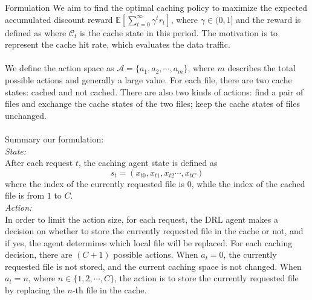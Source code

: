 \documentclass{article}
\begin{document}
\begin{section}{Formulation}
    We aim to find the optimal caching policy to maximize the expected accumulated discount reward $\mathbb{E}\left[\sum_{t=0}^{\infty}\gamma^tr_t\right]$, where $\gamma\in(0,1]$ and the reward is defined as
    where $\mathcal{C}_t$ is the cache state in this period. The motivation is to represent the cache hit rate, which evaluates the data traffic.\\~\\
    
    We define the action space as $\mathcal{A}=\{a_1,a_2,\cdots,a_m\}$, where $m$ describes the total possible actions and generally a large value. For each file, there are two cache states: cached and not cached. There are also two kinds of actions: find a pair of files and exchange the cache states of the two files; keep the cache states of files unchanged.\\~\\
 
    Summary our formulation:\\
    \emph{State:}\\
    After each request $t$, the caching agent state is defined as
    $$
        s_t=\left(x_{t0},x_{t1},x_{t2}\cdots,x_{tC}\right)
    $$
    where the index of the currently requested file is $0$, while the index of the cached file is from $1$ to $C$.\\
    \emph{Action:}\\
    In order to limit the action size, for each request, the DRL agent makes a decision on whether to store the currently requested file in the cache or not, and if yes, the agent determines which local file will be replaced. For each caching decision, there are $(C+1)$ possible actions. When $a_t=0$, the currently requested file is not stored, and the current caching space is not changed. When $a_t=n$, where $n\in\{1,2,\cdots,C\}$, the action is to store the currently requested file by replacing the $n$-th file in the cache.
\end{section}
\end{document}
